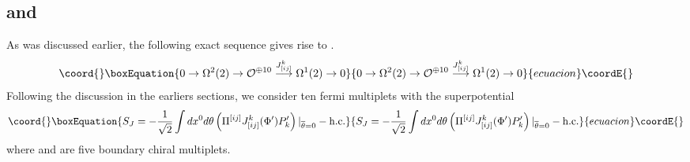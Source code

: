 \documentclass[a4paper,12pt]{article}
\def\Bbb{\mathbb}
\def\BT{\Bbb T}
\begin{document}
\subsection{\coordHE{} and \myHighlight{$\BT^2(-2)$}\coordHE{}}
As was discussed earlier, the following exact sequence gives rise
to \coordHE{}.
\begin{equation}\coord{}\boxEquation{
0\rightarrow \Omega^{2}(2)
\rightarrow {\cal O}^{\oplus 10}\stackrel{J_{[ij]}^k}{\longrightarrow}
\Omega^{1}(2)\rightarrow 0
}{
0\rightarrow \Omega^{2}(2)
\rightarrow {\cal O}^{\oplus 10}\stackrel{J_{[ij]}^k}{\longrightarrow}
\Omega^{1}(2)\rightarrow 0
}{ecuacion}\coordE{}\end{equation}
Following the discussion in the earliers sections,
we consider ten fermi multiplets \myHighlight{$\Pi^{[ij]}$}\coordHE{} with the
superpotential
\begin{equation}\coord{}\boxEquation{
S_J=-{1\over\sqrt2} \int dx^0 d\theta \left(\Pi^{[ij]}
J_{[ij]}^k(\Phi')P_k'\right)|_{\overline{\theta}=0} -
{\rm h.c.}
}{
S_J=-{1\over\sqrt2} \int dx^0 d\theta \left(\Pi^{[ij]}
J_{[ij]}^k(\Phi')P_k'\right)|_{\overline{\theta}=0} -
{\rm h.c.}
}{ecuacion}\coordE{}\end{equation}
where \coordHE{} and
\coordHE{} are five boundary chiral multiplets. 
\end{document}
